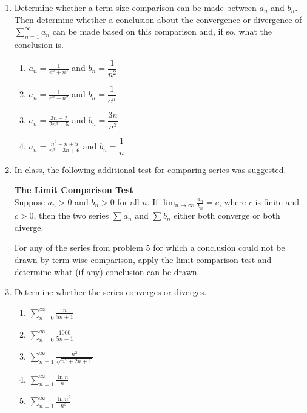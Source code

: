 \documentclass{article}
\begin{document}
\begin{enumerate}
                    \item Determine whether a term-size comparison can be made between $a_n$ and $b_n$.  Then determine whether a conclusion about the convergence or divergence of  $ \sum_{n=1}^\infty a_n$ can be made based on this comparison and, if so, what the conclusion is.
                        \begin{enumerate}
                            \item $ a_n =\frac{1}{e^n+n^2}$ and $ b_n=\dfrac{1}{n^2}$
                            \item $ a_n =\frac{1}{e^n-n^2}$ and $ b_n=\dfrac{1}{e^n}$ 
                            \item  $ a_n = \frac{3n-2}{2n^3+5}$ and $b_n=\dfrac{3n}{n^3}$
                            \item $ a_n = \frac{n^2-n+5}{n^3-3n+6}$ and $b_n=\dfrac{1}{n}$
                        \end{enumerate}
                    \item In class, the following additional test for comparing series was suggested.                   \begin{framed}
                    \noindent \textbf{The Limit Comparison Test}\\
                    Suppose $a_n>0$ and $b_n>0$ for all $n$.  If $ \lim_{n\rightarrow\infty}\frac{a_n}{b_n} = c$, where $c$ is finite and $c>0$, then the two series $\sum a_n$ and $\sum b_n$ either both converge or both diverge.
                    \end{framed} 
                    For any of the series from problem 5 for which a conclusion could not be  drawn by term-wise comparison, apply the limit comparison test and determine what (if any) conclusion can be drawn.              
                    \item Determine whether the series converges or diverges.
                        \begin{enumerate}
                            \item $ \sum_{n=0}^\infty \frac{n}{5n+1}$
                            \item $ \sum_{n=0}^\infty \frac{1000}{5n-1}$   
                            \item $ \sum_{n=1}^\infty \frac{n^2}{\sqrt{n^7+2n+1}}$
                            \item $ \sum_{n=1}^\infty \frac{\ln n}{n}$
                            \item $ \sum_{n=1}^\infty \frac{\ln n^2}{n^3}$

\end{enumerate}
\end{enumerate}
\end{document}
